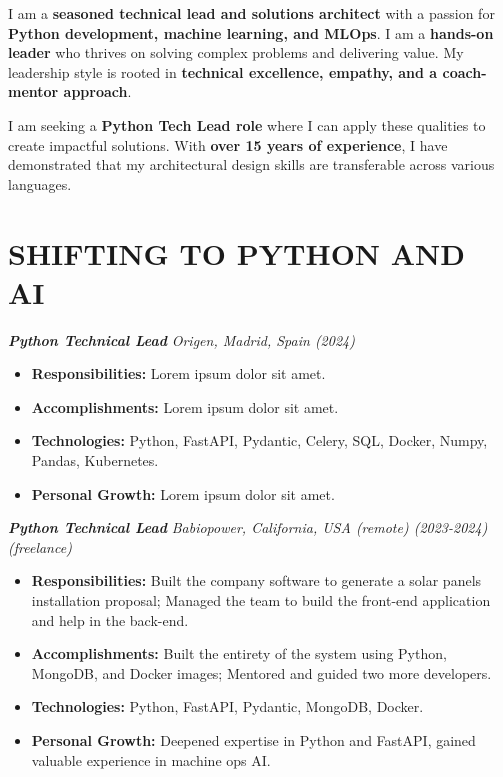 \documentclass[a4paper,10pt]{article}
\begin{document}
\noindent
\begin{minipage}[t]{0.65\textwidth}
\begin{minipage}[t]{\dimexpr\linewidth-25px}
\justifying

I am a \textbf{seasoned technical lead and solutions architect} with a passion for \textbf{Python development, machine learning, and MLOps}. I am a \textbf{hands-on leader} who thrives on solving complex problems and delivering value. My leadership style is rooted in \textbf{technical excellence, empathy, and a coach-mentor approach}.

\vspace{0.5cm}

I am seeking a \textbf{Python Tech Lead role} where I can apply these qualities to create impactful solutions. With \textbf{over 15 years of experience}, I have demonstrated that my architectural design skills are transferable across various languages.

    \section*{\large SHIFTING TO PYTHON AND AI}
    \textbf{\textit{Python Technical Lead}}
    \textit{\small Origen, Madrid, Spain (2024)}
    \vspace{0.3cm}
    \begin{itemize}[leftmargin=*]
        \item \textbf{Responsibilities:} Lorem ipsum dolor sit amet.
        \item \textbf{Accomplishments:} Lorem ipsum dolor sit amet.
        \item \textbf{Technologies:} Python, FastAPI, Pydantic, Celery, SQL, Docker, Numpy, Pandas, Kubernetes.
        \item \textbf{Personal Growth:} Lorem ipsum dolor sit amet.
    \end{itemize}

    \vspace{1cm}

    \textbf{\textit{Python Technical Lead}}
    \textit{\small Babiopower, California, USA (remote) (2023-2024) (freelance)}
    \vspace{0.3cm}
    \begin{itemize}[leftmargin=*]
        \item \textbf{Responsibilities:} Built the company software to generate a solar panels installation proposal;
    Managed the team to build the front-end application and help in the back-end.
        \item \textbf{Accomplishments:} Built the entirety of the system using Python, MongoDB, and Docker images;
    Mentored and guided two more developers.
        \item \textbf{Technologies:} Python, FastAPI, Pydantic, MongoDB, Docker.
        \item \textbf{Personal Growth:} Deepened expertise in Python and FastAPI, gained valuable experience in machine ops AI.
    \end{itemize}


\end{minipage}
\end{minipage}
\end{document}
